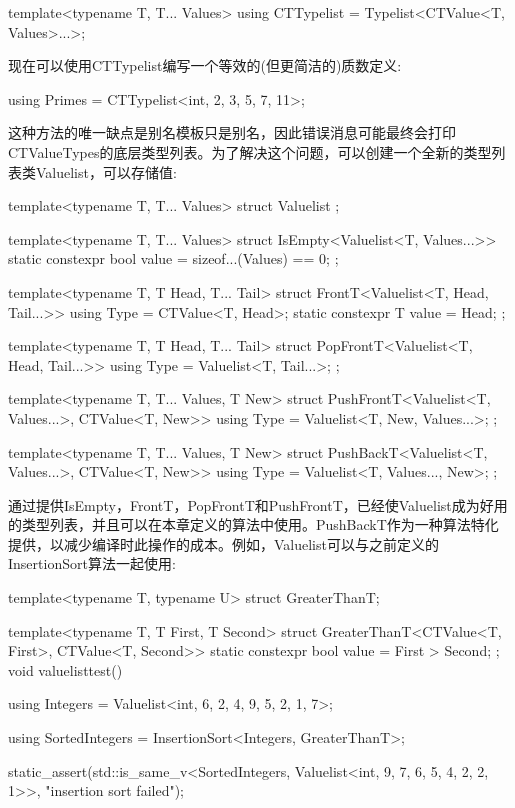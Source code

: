 \begin{cpp}
template<typename T, T... Values>
using CTTypelist = Typelist<CTValue<T, Values>...>;
\end{cpp}

现在可以使用CTTypelist编写一个等效的(但更简洁的)质数定义:

\begin{cpp}
using Primes = CTTypelist<int, 2, 3, 5, 7, 11>;
\end{cpp}

这种方法的唯一缺点是别名模板只是别名，因此错误消息可能最终会打印CTValueTypes的底层类型列表。为了解决这个问题，可以创建一个全新的类型列表类Valuelist，可以存储值:

\begin{cpp}
template<typename T, T... Values>
struct Valuelist {
};

template<typename T, T... Values>
struct IsEmpty<Valuelist<T, Values...>> {
	static constexpr bool value = sizeof...(Values) == 0;
};

template<typename T, T Head, T... Tail>
struct FrontT<Valuelist<T, Head, Tail...>> {
	using Type = CTValue<T, Head>;
	static constexpr T value = Head;
};

template<typename T, T Head, T... Tail>
struct PopFrontT<Valuelist<T, Head, Tail...>> {
	using Type = Valuelist<T, Tail...>;
};

template<typename T, T... Values, T New>
struct PushFrontT<Valuelist<T, Values...>, CTValue<T, New>> {
	using Type = Valuelist<T, New, Values...>;
};

template<typename T, T... Values, T New>
struct PushBackT<Valuelist<T, Values...>, CTValue<T, New>> {
	using Type = Valuelist<T, Values..., New>;
};
\end{cpp}

通过提供IsEmpty，FrontT，PopFrontT和PushFrontT，已经使Valuelist成为好用的类型列表，并且可以在本章定义的算法中使用。PushBackT作为一种算法特化提供，以减少编译时此操作的成本。例如，Valuelist可以与之前定义的InsertionSort算法一起使用:

\begin{cpp}
template<typename T, typename U>
struct GreaterThanT;

template<typename T, T First, T Second>
struct GreaterThanT<CTValue<T, First>, CTValue<T, Second>> {
	static constexpr bool value = First > Second;
};
void valuelisttest()
{
	using Integers = Valuelist<int, 6, 2, 4, 9, 5, 2, 1, 7>;
	
	using SortedIntegers = InsertionSort<Integers, GreaterThanT>;
	
	static_assert(std::is_same_v<SortedIntegers,
								Valuelist<int, 9, 7, 6, 5, 4, 2, 2, 1>>,
				"insertion sort failed");
}
\end{cpp}

